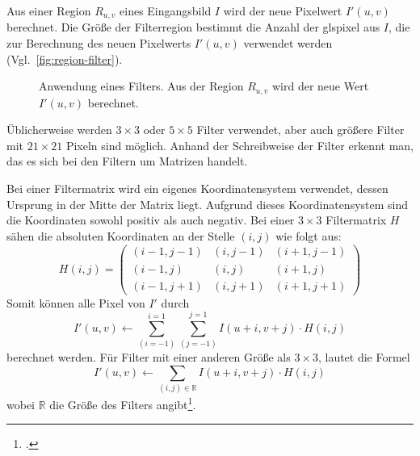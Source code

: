 Aus einer Region $R_{u,v}$ eines Eingangsbild $I$ wird der neue Pixelwert $I'(u,v)$ berechnet. Die Größe der
 Filterregion bestimmt die Anzahl der gls{pixel} aus $I$, die zur Berechnung des neuen Pixelwerts $I'(u,v)$ verwendet
 werden (Vgl.~\autoref{fig:region-filter}).
\begin{figure}[!ht]
	\centering
	
	\caption{Anwendung eines Filters. Aus der Region $R_{u,v}$ wird der neue Wert $I'(u,v)$ berechnet.}
	\label{fig:region-filter}
\end{figure}
Üblicherweise werden $3 \times 3$ oder $5 \times 5$ Filter verwendet, aber auch größere Filter mit $21 \times 21$
 Pixeln sind möglich. Anhand der Schreibweise der Filter erkennt man, das es sich bei den Filtern um Matrizen handelt.

Bei einer Filtermatrix wird ein eigenes Koordinatensystem verwendet, dessen Ursprung in der Mitte der Matrix liegt.
 Aufgrund dieses Koordinatensystem sind die Koordinaten sowohl positiv als auch negativ. Bei einer $3 \times 3$
 Filtermatrix $H$ sähen die absoluten Koordinaten an der Stelle $(i,j)$ wie folgt aus:
\begin{equation}
	H(i,j) =
	\begin{pmatrix}
		\left(i-1, j-1\right)&	\left(i, j-1\right)&	\left(i+1, j-1\right)\\
		\left(i-1, j\right)& 	\left(i, j\right)&		\left(i+1, j\right)\\
		\left(i-1, j+1\right)&	\left(i, j+1\right)&	\left(i+1, j+1\right)
	\end{pmatrix}
\end{equation}
Somit können alle Pixel von $I'$ durch
\begin{equation}
	I'\left(u,v\right) \gets
	\sum \limits_{\left(i = -1\right)}^{i = 1}
	\sum \limits_{\left(j = -1\right)}^{j = 1}
	I\left(u + i, v + j\right) \cdot H\left(i,j\right)
\end{equation}
berechnet werden. Für Filter mit einer anderen Größe als $3 \times 3$, lautet die Formel
\begin{equation}
	I'\left(u,v\right) \gets
	\sum_{\left(i,j\right)\in\mathbb{R}} I\left(u + i, v + j\right) \cdot H\left(i,j\right)
\end{equation}
wobei $\mathbb{R}$ die Größe des Filters angibt\footcite[Vgl.][S.~92--93]{burger05}.

